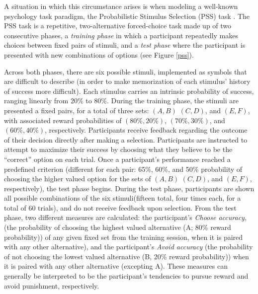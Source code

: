 \documentclass[10pt,letterpaper]{article}
\begin{document}
A situation in which this circumstance arises is when modeling a well-known psychology task paradigm, the Probabilistic Stimulus Selection (PSS) task \cite{frank2004carrot}. The PSS task is a repetitive, two-alternative forced-choice task made up of two consecutive phases, a \emph{training phase} in which a participant repeatedly makes choices between fixed pairs of stimuli, and a \emph{test phase} where the participant is presented with new combinations of options (see Figure \ref{pss}).

Across both phases, there are six possible stimuli, implemented as symbols that are difficult to describe (in order to make memorization of each stimulus’ history of success more difficult). Each stimulus carries an intrinsic probability of success, ranging linearly from 20\% to 80\%. During the training phase, the stimuli are presented a fixed pairs, for a total of three sets: $(A, B)$  $(C,D)$, and $(E, F)$, with associated reward probabilities of $(80\%, 20\%)$, $(70\%, 30\%)$, and $(60\%, 40\%)$, respectively. Participants receive feedback regarding the outcome of their decision directly after making a selection. Participants are instructed to attempt to maximize their success by choosing what they believe to be the ``correct'' option on each trial. Once a participant’s performance reached a predefined criterion (different for each pair: 65\%, 60\%, and 50\% probability of choosing the higher valued option for the sets of $(A, B)$  $(C,D)$, and $(E, F)$, respectively), the test phase begins. During the test phase, participants are shown all possible combinations of the six stimuli(fifteen total, four times each, for a total of 60 trials), and do not receive feedback upon selection. From the test phase, two different measures are calculated: the participant's \emph{Choose accuracy}, (the probability of choosing the highest valued alternative (A; 80\% reward probability)) of any given fixed set from the training session, when it is paired with any other alternative), and the participant's \emph{Avoid accuracy} (the probability of not choosing the lowest valued alternative (B, 20\% reward probability)) when it is paired with any other alternative (excepting A). These measures can generally be interpreted to be the participant's tendencies to pursue reward and avoid punishment, respectively.
\end{document}
